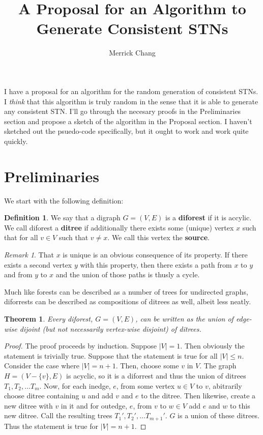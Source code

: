 \documentclass[12pt]{article}
\newtheorem{theorem}{Theorem}[section]
\theoremstyle{remark}
\newtheorem*{remark}{Remark}
\theoremstyle{definition}
\newtheorem{definition}{Definition}[section]
\begin{document}
 \title{A Proposal for an Algorithm to Generate Consistent STNs}
 \author{Merrick Chang}
 \maketitle
 
I have a proposal for an algorithm for the random generation of consistent STNs. I  \textit{think} that this algorithm is truly random in the sense that it is able to generate any consistent STN. I'll go through the necesary proofs in the Preliminaries section and propose a sketch of the algorithm in the Proposal section. I haven't sketched out the psuedo-code specifically, but it ought to work and work quite quickly.

\section{Preliminaries}

We start with the following definition:

\begin{definition} We say that a digraph $G = (V, E)$ is a \textbf{diforest} if it is accylic. We call diforest a \textbf{ditree} if additionally there exists some (unique) vertex $x$ such that for all $v \in V$ such that $v \neq x$. We call this vertex the \textbf{source}.
\end{definition}

\begin{remark}That $x$ is unique is an obvious consequence of its property. If there exists a second vertex $y$ with this property, then there exists a path from $x$ to $y$ and from $y$ to $x$ and the union of those paths is thusly a cycle.\end{remark}

Much like forests can be described as a number of trees for undirected graphs, diforrests can be described as compositions of ditrees as well, albeit less neatly.

\begin{theorem} Every diforest, $G = (V, E)$, can be written as the union of edge-wise dijoint (but not necessarily vertex-wise disjoint) of ditrees.
\end{theorem}

\begin{proof}The proof proceeds by induction. Suppose $|V|=1$. Then obviously the statement is trivially true. Suppose that the statement is true for all $|V| \leq n$. Consider the case where $|V| = n+1$. Then, choose some $v$ in $V$. The graph $H = (V-\{v\}, E)$ is acyclic, so it is a diforrest and thus the union of ditrees $T_1,T_2, \dots T_m$. Now, for each inedge, $e$, from some vertex $u \in V$ to $v$, abitrarily choose ditree containing $u$ and add $v$ and $e$ to the ditree. Then likewise, create a new ditree with $v$ in it and for outedge, $e$, from $v$ to $w \in V$ add $e$ and $w$ to this new ditree. Call the resulting trees $T_1',T_2', \dots T_{m+1}'$. $G$ is a union of these ditrees. Thus the statement is true for $|V| = n+1$.
\end{proof}
\end{document}
